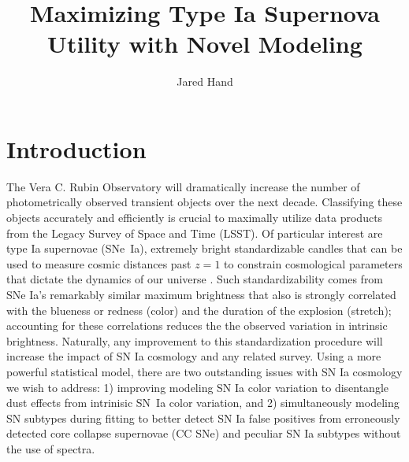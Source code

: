 \documentclass[modern]{aastex63}
\begin{document}
\title{Maximizing Type Ia Supernova Utility with Novel Modeling}

\author{Jared Hand}

\section{Introduction}
The Vera C. Rubin Observatory will dramatically increase the number of photometrically observed transient objects over the next decade. 
Classifying these objects accurately and efficiently is crucial to maximally utilize data products from the Legacy Survey of Space and Time (LSST). 
Of particular interest are type Ia supernovae (SNe~Ia), extremely bright standardizable candles that can be used to measure cosmic distances past $z=1$ to constrain cosmological parameters that dictate the dynamics of our universe \citep{Perlmutter1999}.  
Such standardizability comes from SNe Ia's remarkably similar maximum brightness that also is strongly correlated with the blueness or redness (color) and the duration of the explosion (stretch); accounting for these correlations reduces the the observed variation in intrinsic brightness. 
Naturally, any improvement to this standardization procedure will increase the impact of SN Ia cosmology and any related survey.
Using a more powerful statistical model, there are two outstanding issues with SN Ia cosmology we wish to address: 1) improving modeling SN Ia color variation to disentangle dust effects from intrinisic SN~Ia color variation, and 2) simultaneously modeling SN subtypes during fitting to better detect SN Ia false positives from erroneously detected core collapse supernovae (CC SNe) and peculiar SN Ia subtypes without the use of spectra.
\end{document}
